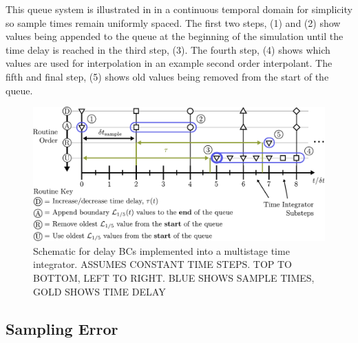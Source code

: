 This queue system is illustrated in  in a continuous temporal domain for simplicity so sample times remain uniformly spaced. The first two steps, (1) and (2) show values being appended to the queue at the beginning of the simulation until the time delay is reached in the third step, (3). The fourth step, (4) shows which values are used for interpolation in an example second order interpolant. The fifth and final step, (5) shows old values being removed from the start of the queue. 



\begin{figure}[t]
\centering
\includegraphics[scale=0.65]{assets/imgs/delay_bc_code_schematic.pdf}
\caption{Schematic for delay BCs implemented into a multistage time integrator. ASSUMES CONSTANT TIME STEPS. TOP TO BOTTOM, LEFT TO RIGHT. BLUE SHOWS SAMPLE TIMES, GOLD SHOWS TIME DELAY}
\label{fig:schematic}
\end{figure}



\subsection{Sampling Error}

